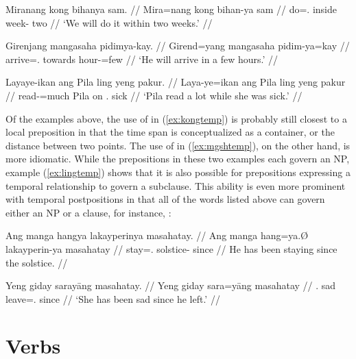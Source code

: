 \pex
\a\label{ex:kongtemp}\begingl
	\gla Miranang kong bihanya sam. //
	\glb Mira=nang kong bihan-ya sam //
	\glc do=\Fpl{}.\Aarg{} inside week-\Loc{} two //
	\glft `We will do it within two weeks.' //
\endgl

\a\label{ex:mgshtemp}\begingl
	\gla Girenjang mangasaha pidimya-kay. //
	\glb Girend=yang mangasaha pidim-ya=kay //
	\glc arrive=\TsgM{}.\Aarg{} towards hour-\Loc{}=few //
	\glft `He will arrive in a few hours.' //
\endgl

\a\label{ex:lingtemp}\begingl
	\gla Layaye-ikan ang Pila ling yeng pakur. //
	\glb Laya-ye=ikan ang Pila ling yeng pakur //
	\glc read-\TsgF{}=much \Aarg{} Pila on \TsgF{}.\Aarg{} sick //
	\glft `Pila read a lot while she was sick.' //
\endgl

\xe

Of the examples above, the use of  in (\ref{ex:kongtemp}) is 
probably still closest to a local preposition in that the time span is 
conceptualized as a container, or the distance between two points. The use of 
 in (\ref{ex:mgshtemp}), on the other hand, is more 
idiomatic. While the prepositions in these two examples each govern an NP, 
example (\ref{ex:lingtemp}) shows that it is also possible for prepositions 
expressing a temporal relationship to govern a subclause. This ability is 
even more prominent with temporal postpositions in that all of the words listed 
above can govern either an NP or a clause, for instance, 
:

\pex
\a\label{ex:mshtaynp}\begingl
	\gla Ang manga hangya lakayperinya masahatay. //
	\glb Ang manga hang=ya.Ø lakayperin-ya masahatay //
	\glc \AgtT{} \Prog{} stay=\TsgM{}.\Top{} solstice-\Loc{} since //
	\glft He has been staying since the solstice. //
\endgl

\a\label{ex:mshtays}\begingl
	\gla Yeng giday sarayāng masahatay. //
	\glb Yeng giday sara=yāng masahatay //
	\glc \TsgF{}.\Aarg{} sad leave=\TsgM{}.\Aarg{} since //
	\glft `She has been sad since he left.' //
\endgl

\xe



\section{Verbs}

